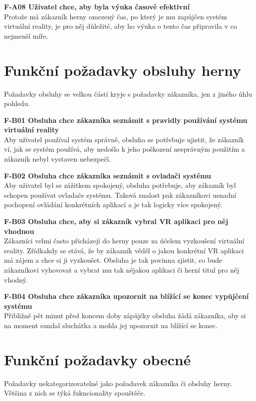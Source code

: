 \textbf{F-A08 Uživatel chce, aby byla výuka časově efektivní}\\
Protože má zákazník herny omezený čas, po který je mu zapůjčen systém
virtuální reality, je pro něj důležité, aby ho výuka o tento čas
připravila v co nejmenší míře.

\section{Funkční požadavky obsluhy
herny}\label{funkux10dnuxed-poux17eadavky-obsluhy-herny}

Požadavky obsluhy se velkou částí kryje s požadavky zákazníka, jen z
jiného úhlu pohledu.

\textbf{F-B01 Obsluha chce zákazníka seznámit s pravidly používání
systému virtuální reality}\\
Aby uživatel používal systém správně, obsluha se potřebuje ujistit, že
zákazník ví, jak se systém používá, aby nedošlo k jeho poškození
nesprávným použitím a zákazník nebyl vystaven nebezpečí.

\textbf{F-B02 Obsluha chce zákazníka seznámit s ovladači systému}\\
Aby uživatel byl se zážitkem spokojený, obsluha potřebuje, aby zákazník
byl schopen používat ovladače systému. Taková znalost pak zákazníkovi
usnadní pochopení ovládání konkrétních aplikací a je tak logicky více
spokojený.

\textbf{F-B03 Obsluha chce, aby si zákazník vybral VR aplikaci pro něj
vhodnou}\\
Zákazníci velmi často přicházejí do herny pouze za účelem vyzkoušení
virtuální reality. Zřídkakdy se stává, že by zákazník věděl o jakou
konkrétní VR aplikaci má zájem a chce si ji vyzkoušet. Obsluha je tak
povinna zjistit, co bude zákazníkovi vyhovovat a vybrat mu tak nějakou
aplikaci či herní titul pro něj vhodný.

\textbf{F-B04 Obsluha chce zákazníka upozornit na blížící se konec
vypůjčení systému}\\
Přibližně pět minut před koncem doby zápůjčky obsluha žádá zákazníka,
aby si na moment sundal sluchátka a mohla jej upozornit na blížící se
konec.

\section{Funkční požadavky
obecné}\label{funkux10dnuxed-poux17eadavky-obecnuxe9}

Požadavky nekategorizovatelné jako požadavek zákazníka či obsluhy
herny. Většina z nich se týká fukncionality spouštěče.

